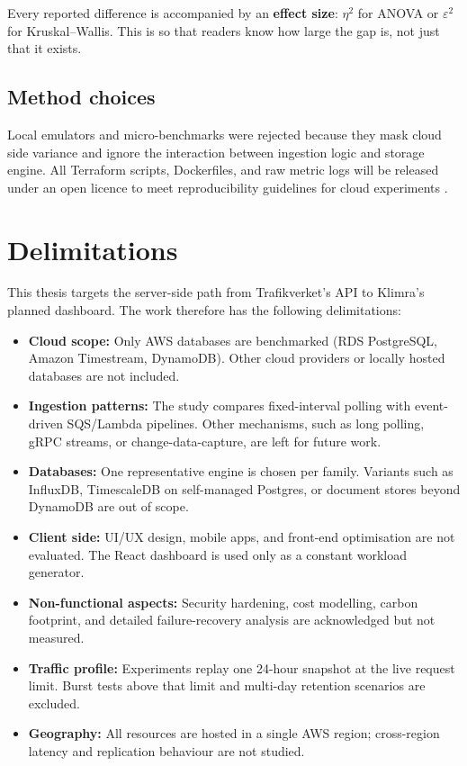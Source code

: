 \documentclass[nomenclature, english, biblatex]{kththesis}
\numberwithin{listing}{chapter}
\begin{document}
\noindent
Every reported difference is accompanied by an \textbf{effect size}: $\eta^{2}$ for ANOVA or $\varepsilon^{2}$ for Kruskal–Wallis. This is so that readers know how large the gap is, not just that it exists.


\subsection{Method choices}
Local emulators and micro-benchmarks were rejected because they mask cloud side variance and ignore the interaction between ingestion logic and storage engine. All Terraform scripts, Dockerfiles, and raw metric logs will be released under an open licence to meet reproducibility guidelines for cloud experiments \cite{PerformanceEvaluationMetrics}.






\section{Delimitations}
\label{sec:delimitations}
This thesis targets the server-side path from Trafikverket's \gls{API} to Klimra's planned dashboard. The work therefore has the following delimitations:

\begin{itemize}[noitemsep,leftmargin=*]
  \item \textbf{Cloud scope:} Only AWS databases are benchmarked (RDS PostgreSQL, Amazon Timestream, DynamoDB). Other cloud providers or locally hosted databases are not included.

  \item \textbf{Ingestion patterns:} The study compares fixed-interval polling with event-driven SQS/Lambda pipelines. Other mechanisms, such as long polling, gRPC streams, or change-data-capture, are left for future work.

  \item \textbf{Databases:} One representative engine is chosen per family. Variants such as InfluxDB, TimescaleDB on self-managed Postgres, or document stores beyond DynamoDB are out of scope.

  \item \textbf{Client side:} UI/UX design, mobile apps, and front-end optimisation are not evaluated. The React dashboard is used only as a constant workload generator.

  \item \textbf{Non-functional aspects:} Security hardening, cost modelling, carbon footprint, and detailed failure-recovery analysis are acknowledged but not measured.

  \item \textbf{Traffic profile:} Experiments replay one 24-hour snapshot at the live request limit. Burst tests above that limit and multi-day retention scenarios are excluded.

  \item \textbf{Geography:} All resources are hosted in a single AWS region; cross-region latency and replication behaviour are not studied.
\end{itemize}
\end{document}
